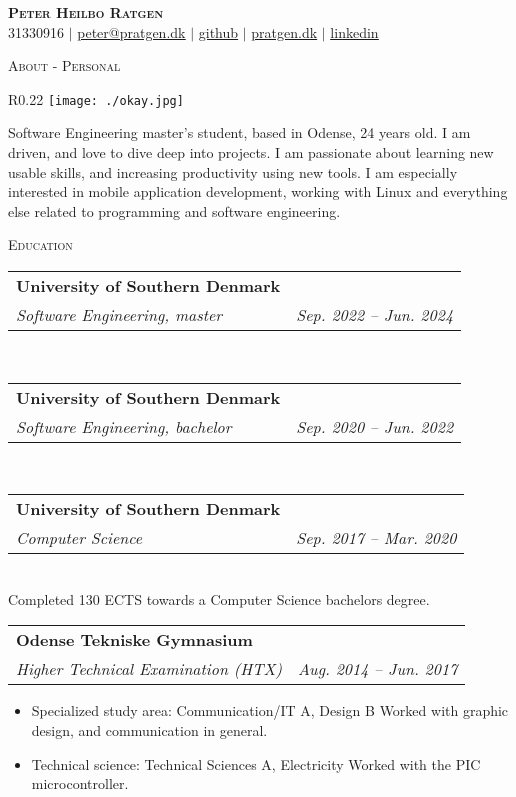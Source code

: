 \documentclass[11pt]{article}
\makeatletter
\newcommand{\resumeSubheading}[4]{
  \noindent\begin{tabular*}{0.98\textwidth}[t]{l@{\extracolsep{\fill}}r}
    \noindent \textbf{#1} & #2 \\ \vspace{-3pt} 
    \noindent \textit{\small#3} & \textit{\small #4} 
  \end{tabular*}\vspace{7pt}
}
\makeatother
\begin{document}
\begin{center}
  \textbf{\huge{\scshape{Peter Heilbo Ratgen}}}\\ 
  \vspace{0.2cm}
  \small 31330916 $|$
  \href{mailto:peter@pratgen.dk}{\underline{peter@pratgen.dk}} $|$
  \href{https://github.com/ratgen }{\underline{github}} $|$
  \href{https://pratgen.dk}{\underline{pratgen.dk}} $|$
  \href{https://www.linkedin.com/in/peter-ratgen-a1236529/}{\underline{linkedin}}
\end{center}

\noindent\large{\scshape{About - Personal}} \newline
\noindent{\rule[0.3cm]{\textwidth}{0.4pt}}

\begin{wrapfigure}{R}{0.22\textwidth}
  \vspace{-0.7cm}
  \texttt{[image: ./okay.jpg]}
\end{wrapfigure}
\normalsize Software Engineering master's student, based in Odense, 24 years
old. I am driven, and love to dive deep into projects. I am passionate about
learning new usable skills, and increasing productivity using new tools. I am
especially interested in mobile application development, working with Linux and
everything else related to programming and software engineering. 

\vspace{0.3cm}
\noindent\large{\scshape{Education}} \newline
\noindent{\rule[0.3cm]{\textwidth}{0.4pt}}

\resumeSubheading{University of Southern Denmark}{}{Software Engineering, master}{Sep.
2022 -- Jun. 2024}\\\vspace{0.25cm}

\resumeSubheading{University of Southern Denmark}{}{Software Engineering, bachelor}{Sep.
2020 -- Jun. 2022}\\\vspace{0.25cm}

\resumeSubheading{University of Southern Denmark}{}{Computer Science}{Sep. 2017
-- Mar. 2020}\\\vspace{0.25cm} 
{\indent\small Completed 130 ECTS towards a Computer Science bachelors degree.}
\vspace{0.3cm}

\resumeSubheading{Odense Tekniske Gymnasium}{}{Higher Technical
Examination (HTX)}{Aug. 2014 -- Jun. 2017}
{\small \begin{itemize}\vspace{-0.25cm}
  \setlength{\itemsep}{-1pt}
  \item Specialized study area: Communication/IT A, Design B
    \subitem Worked with graphic design, and communication in general.

  \item Technical science: Technical Sciences A, Electricity
    \subitem\footnotesize Worked with the PIC microcontroller.
\end{itemize}
} \vspace{0.5cm}
\end{document}
